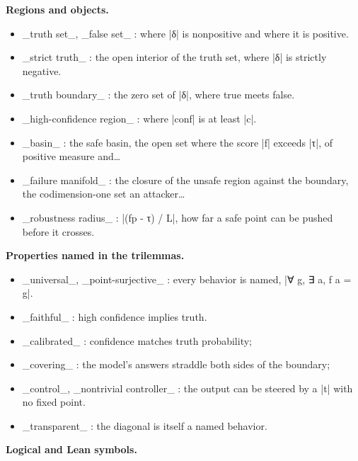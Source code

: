 \documentclass{memoir}
\begin{document}
\textbf{Regions and objects.}

\begin{itemize}
\item \_truth set\_, \_false set\_ : where \LeanVerb|δ| is nonpositive and where it is positive.
\item \_strict truth\_ : the open interior of the truth set, where \LeanVerb|δ| is strictly
   negative.
\item \_truth boundary\_ : the zero set of \LeanVerb|δ|, where true meets false.
\item \_high-confidence region\_ : where \LeanVerb|conf| is at least \LeanVerb|c|.
\item \_basin\_ : the safe basin, the open set where the score \LeanVerb|f| exceeds \LeanVerb|τ|, of
   positive measure and…
\item \_failure manifold\_ : the closure of the unsafe region against the boundary, the
   codimension-one set an attacker…
\item \_robustness radius\_ : \LeanVerb|(fp - τ) / L|, how far a safe point can be pushed before
   it crosses.

\end{itemize}


\textbf{Properties named in the trilemmas.}

\begin{itemize}
\item \_universal\_, \_point-surjective\_ : every behavior is named, \LeanVerb|∀ g, ∃ a, f a = g|.
\item \_faithful\_ : high confidence implies truth.
\item \_calibrated\_ : confidence matches truth probability;
\item \_covering\_ : the model's answers straddle both sides of the boundary;
\item \_control\_, \_nontrivial controller\_ : the output can be steered by a \LeanVerb|t| with
   no fixed point.
\item \_transparent\_ : the diagonal is itself a named behavior.

\end{itemize}


\textbf{Logical and Lean symbols.}
\end{document}
